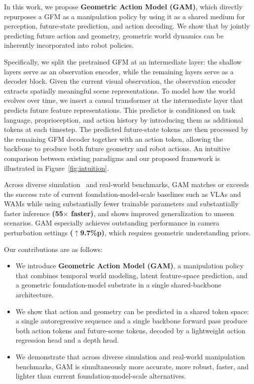 In this work, we propose \textbf{Geometric Action Model (GAM)}, which directly repurposes a GFM as a manipulation policy by using it as a shared medium for perception, future-state prediction, and action decoding. We show that by jointly predicting future action and geometry, geometric world dynamics can be inherently incorporated into robot policies.

Specifically, we split the pretrained GFM at an intermediate layer: the shallow layers serve as an observation encoder, while the remaining layers serve as a decoder block. Given the current visual observation, the observation encoder extracts spatially meaningful scene representations. To model how the world evolves over time, we insert a causal transformer at the intermediate layer that predicts future feature representations. This predictor is conditioned on task language, proprioception, and action history by introducing them as additional tokens at each timestep. The predicted future-state tokens are then processed by the remaining GFM decoder together with an action token, allowing the backbone to produce both future geometry and robot actions. An intuitive comparison between existing paradigms and our proposed framework is illustrated in Figure~\ref{fig:intuition}.


Across diverse simulation~\citep{liu2023libero,fei2025libero,nasiriany2024robocasa} and real-world benchmarks, GAM matches or exceeds the success rate of current foundation-model-scale baselines such as VLAs and WAMs while using substantially fewer trainable parameters and substantially faster inference \textbf{(55$\times$ faster)}, and shows improved generalization to unseen scenarios. GAM especially achieves outstanding performance in camera perturbation settings \textbf{($\uparrow$9.7\%p)}, which requires geometric understanding priors. 

Our contributions are as follows:
\vspace{-2.5pt}
\begin{itemize}
    \item We introduce \textbf{Geometric Action Model (GAM)}, a manipulation policy that combines temporal world modeling, latent feature-space prediction, and a geometric foundation-model substrate in a single shared-backbone architecture.
    \item We show that action and geometry can be predicted in a shared token space: a single autoregressive sequence and a single backbone forward pass produce both action tokens and future-scene tokens, decoded by a lightweight action regression head and a depth head.
    \item We demonstrate that across diverse simulation and real-world manipulation benchmarks, GAM is simultaneously more accurate, more robust, faster, and lighter than current foundation-model-scale alternatives.
\end{itemize}